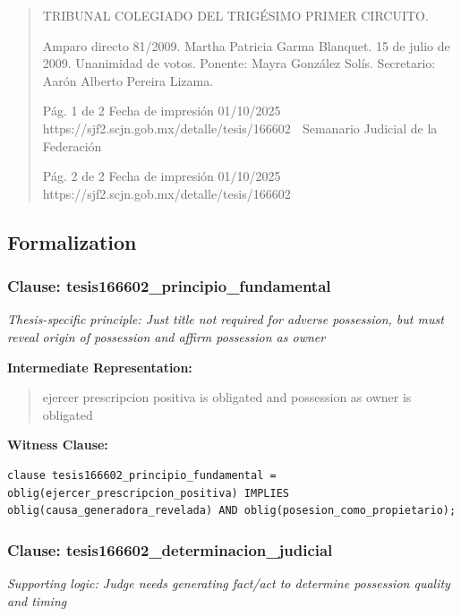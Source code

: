 \documentclass[11pt,a4paper]{article}
\begin{document}
\begin{quote}
TRIBUNAL COLEGIADO DEL TRIGÉSIMO PRIMER CIRCUITO.


Amparo directo 81/2009. Martha Patricia Garma Blanquet. 15 de julio de 2009. Unanimidad de
votos. Ponente: Mayra González Solís. Secretario: Aarón Alberto Pereira Lizama.




                                              Pág. 1 de 2              Fecha de impresión 01/10/2025
  https://sjf2.scjn.gob.mx/detalle/tesis/166602
                                                Semanario Judicial de la Federación




                                           Pág. 2 de 2       Fecha de impresión 01/10/2025
https://sjf2.scjn.gob.mx/detalle/tesis/166602

\end{quote}

\subsection{Formalization}

\subsubsection{Clause: tesis166602\_principio\_fundamental}

\textit{Thesis-specific principle: Just title not required for adverse possession, but must reveal origin of possession and affirm possession as owner}

\textbf{Intermediate Representation:}

\begin{quote}
ejercer prescripcion positiva is obligated and possession as owner is obligated
\end{quote}

\textbf{Witness Clause:}

\begin{lstlisting}[style=witnessstyle, language=Witness]
clause tesis166602_principio_fundamental = oblig(ejercer_prescripcion_positiva) IMPLIES oblig(causa_generadora_revelada) AND oblig(posesion_como_propietario);
\end{lstlisting}

\subsubsection{Clause: tesis166602\_determinacion\_judicial}

\textit{Supporting logic: Judge needs generating fact/act to determine possession quality and timing}
\end{document}
